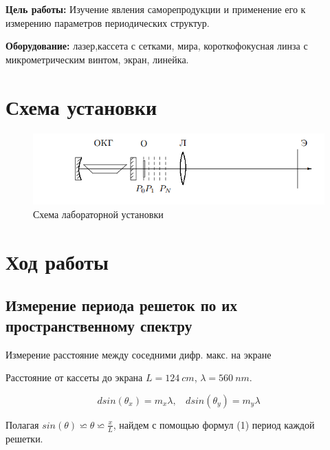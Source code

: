 


  


\textbf{Цель работы:}
Изучение явления саморепродукции и применение его к измерению параметров периодических структур.

\textbf{Оборудование:} лазер,кассета с сетками, мира, короткофокусная линза с микрометрическим винтом, экран, линейка.



\section{Схема установки}

\begin{figure}[h!]
    \centering
    \includegraphics[width=15cm]{pics/scheme.png}
    \caption{Схема лабораторной установки}
    \label{fig:vac}
\end{figure}

\section{Ход работы}


\subsection{Измерение периода решеток по их пространственному спектру}


\begin{table}[h!]
	\centering
	
	\caption{Измерение расстояние между соседними дифр. макс. на экране}
	\label{nu1}
\end{table}


Расстояние от кассеты до экрана $L = 124 \: cm$, $\lambda = 560 \: nm$.

\begin{equation}
    dsin(\theta_x) = m_x \lambda, \:\:\:\: d sin(\theta_y) = m_y \lambda     
  \label{first}
\end{equation}

Полагая $sin(\theta) \backsimeq \theta \backsimeq \frac{x}{L}$, найдем с помощью формул (1) период каждой решетки.

